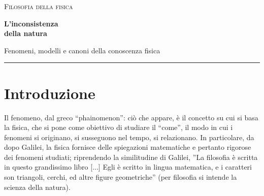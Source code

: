 \documentclass[11pt,a4paper]{article}
\newcommand{\AuthorName}{}
\begin{document}
\thispagestyle{plain}
\begin{center}
{\small\scshape Filosofia della fisica}\par\vspace{12pt}
{\fontsize{28}{32}\selectfont\bfseries\color{ink} L’inconsistenza\\[4pt] della natura}\par\vspace{10pt}
{\large Fenomeni, modelli e canoni della conoscenza fisica}\par
\ifx\AuthorName\empty\else\vspace{10pt}\AuthorName\par\fi
\vspace{12pt}\textcolor{ink}{\rule{0.22\textwidth}{0.6pt}}
\end{center}
\begin{abstract}
Il saggio esamina il rapporto tra realtà fenomenica, formalizzazione matematica e costruzione dei modelli fisici. L’argomentazione si articola intorno a cinque canoni: uniformità, costanza, direzione, simmetria e conservazione. Attraverso esempi tratti dalla meccanica, dalla termodinamica e dalla teoria dei campi, il testo propone una lettura filosofica del ruolo dell’osservatore nella definizione della «natura teorica».
\end{abstract}
\par\vspace{5pt}
\section{Introduzione}
Il fenomeno, dal greco “phainomenon”: ciò che appare, è il concetto su cui si basa la fisica, che si pone come obiettivo di studiare il “come”, il modo in cui i fenomeni si originano, si susseguono nel tempo, si relazionano. In particolare, da dopo Galilei, la fisica fornisce delle spiegazioni matematiche e pertanto rigorose dei fenomeni studiati; riprendendo la similitudine di Galilei, ”La filosofia è scritta in questo grandissimo libro [...] Egli è scritto in lingua matematica, e i caratteri son triangoli, cerchi, ed altre figure geometriche” (per filosofia si intende la scienza della natura). 
\end{document}
